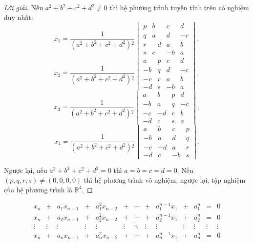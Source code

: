 \begin{proof}[Lời giải]
    Nếu $a^{2} + b^{2} + c^{2} + d^{2} \ne 0$ thì hệ phương trình tuyến tính trên có nghiệm duy nhất:
    \[
        x_{1} = \dfrac{1}{(a^{2} + b^{2} + c^{2} + d^{2}){}^{2}}
        \begin{vmatrix}
            p & b  & c  & d  \\
            q & a  & d  & -c \\
            r & -d & a  & b  \\
            s & c  & -b & a
        \end{vmatrix},
    \]
    \[
        x_{2} = \dfrac{1}{(a^{2} + b^{2} + c^{2} + d^{2}){}^{2}}
        \begin{vmatrix}
            a  & p & c  & d  \\
            -b & q & d  & -c \\
            -c & r & a  & b  \\
            -d & s & -b & a
        \end{vmatrix},
    \]
    \[
        x_{3} = \dfrac{1}{(a^{2} + b^{2} + c^{2} + d^{2}){}^{2}}
        \begin{vmatrix}
            a  & b  & p & d  \\
            -b & a  & q & -c \\
            -c & -d & r & b  \\
            -d & c  & s & a
        \end{vmatrix},
    \]
    \[
        x_{4} = \dfrac{1}{(a^{2} + b^{2} + c^{2} + d^{2}){}^{2}}
        \begin{vmatrix}
            a  & b  & c  & p \\
            -b & a  & d  & q \\
            -c & -d & a  & r \\
            -d & c  & -b & s
        \end{vmatrix}.
    \]
    
    Ngược lại, nếu $a^{2} + b^{2} + c^{2} + d^{2} = 0$ thì $a = b = c = d = 0$. Nếu $(p, q, r, s) \ne (0, 0, 0, 0)$ thì hệ phương trình vô nghiệm, ngược lại, tập nghiệm của hệ phương trình là $\mathbb{R}^{4}$.
\end{proof}

\begin{exercise}
    \[
        \begin{array}{ccccccccccccc}
            x_{n}  & +      & a_{1}x_{n-1} & +      & a_{1}^{2}x_{n-2} & +      & \cdots & +      & a_{1}^{n-1}x_{1} & +      & a_{1}^{n} & =      & 0      \\
            x_{n}  & +      & a_{2}x_{n-1} & +      & a_{2}^{2}x_{n-2} & +      & \cdots & +      & a_{2}^{n-1}x_{1} & +      & a_{2}^{n} & =      & 0      \\
            \vdots & \vdots & \vdots       & \vdots & \vdots           & \vdots & \ddots & \vdots & \vdots           & \vdots & \vdots    & \vdots & \vdots \\
            x_{n}  & +      & a_{n}x_{n-1} & +      & a_{n}^{2}x_{n-2} & +      & \cdots & +      & a_{n}^{n-1}x_{1} & +      & a_{n}^{n} & =      & 0      \\
        \end{array}
    \]
\end{exercise}

